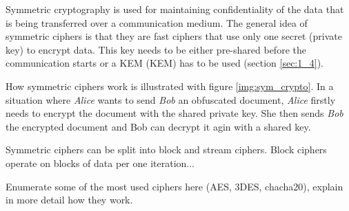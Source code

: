 Symmetric cryptography is used for maintaining confidentiality of the data that is being transferred over a communication medium. The general idea of symmetric ciphers is that they are fast ciphers that use only one secret (private key) to encrypt data. This key needs to be either pre-shared before the communication starts or a KEM ({\acl{KEM}}) has to be used (section \ref{sec:1_4}).

How symmetric ciphers work is illustrated with figure \ref{img:sym_crypto}. In a situation where \textit{Alice} wants to send \textit{Bob} an obfuscated document, \textit{Alice} firstly needs to encrypt the document with the shared private key. She then sends \textit{Bob} the encrypted document and Bob can decrypt it agin with a shared key.


Symmetric ciphers can be split into block and stream ciphers. Block ciphers operate on blocks of data per one iteration...

Enumerate some of the most used ciphers here (AES, 3DES, chacha20), explain in more detail how they work.
